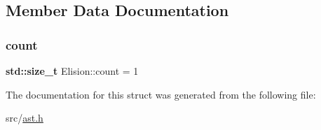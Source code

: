 \subsection{Member Data Documentation}
\mbox{\label{struct_elision_a95bc7263a799380ca4e4ddc0cc0eb622}} 
\subsubsection{\texorpdfstring{count}{count}}
{\footnotesize\ttfamily \textbf{ std\+::size\+\_\+t} Elision\+::count = 1}



The documentation for this struct was generated from the following file\+:\begin{DoxyCompactItemize}
\item 
src/\hyperlink{ast_8h}{ast.\+h}\end{DoxyCompactItemize}
